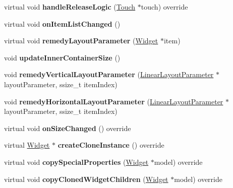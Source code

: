 \begin{DoxyCompactItemize}
virtual void {\bfseries handle\+Release\+Logic} (\hyperlink{classTouch}{Touch} $\ast$touch) override
\item 
\mbox{\label{classui_1_1ListView_a0e26dcfe141e8c8f20f33aef87c0daec}} 
virtual void {\bfseries on\+Item\+List\+Changed} ()
\item 
\mbox{\label{classui_1_1ListView_a40f9bf005bf97706954093adad572a4d}} 
virtual void {\bfseries remedy\+Layout\+Parameter} (\hyperlink{classui_1_1Widget}{Widget} $\ast$item)
\item 
\mbox{\label{classui_1_1ListView_abc4959ce115171f988bad089f0ee900b}} 
void {\bfseries update\+Inner\+Container\+Size} ()
\item 
\mbox{\label{classui_1_1ListView_a4c9fc40aeb27c0c1361f7087b6b9fc16}} 
void {\bfseries remedy\+Vertical\+Layout\+Parameter} (\hyperlink{classui_1_1LinearLayoutParameter}{Linear\+Layout\+Parameter} $\ast$layout\+Parameter, ssize\+\_\+t item\+Index)
\item 
\mbox{\label{classui_1_1ListView_aaf5c944a246168c77a938a69275c1f27}} 
void {\bfseries remedy\+Horizontal\+Layout\+Parameter} (\hyperlink{classui_1_1LinearLayoutParameter}{Linear\+Layout\+Parameter} $\ast$layout\+Parameter, ssize\+\_\+t item\+Index)
\item 
\mbox{\label{classui_1_1ListView_a815a2198f11229bbdb784529c00efebc}} 
virtual void {\bfseries on\+Size\+Changed} () override
\item 
\mbox{\label{classui_1_1ListView_a887ce4b5401afdd04bbe49a12c7da464}} 
virtual \hyperlink{classui_1_1Widget}{Widget} $\ast$ {\bfseries create\+Clone\+Instance} () override
\item 
\mbox{\label{classui_1_1ListView_a7388f3fb985edbfdbb7c628754a0c1d1}} 
virtual void {\bfseries copy\+Special\+Properties} (\hyperlink{classui_1_1Widget}{Widget} $\ast$model) override
\item 
\mbox{\label{classui_1_1ListView_a002be606b8f25fb39dbabae4da37874d}} 
virtual void {\bfseries copy\+Cloned\+Widget\+Children} (\hyperlink{classui_1_1Widget}{Widget} $\ast$model) override

\end{DoxyCompactItemize}
